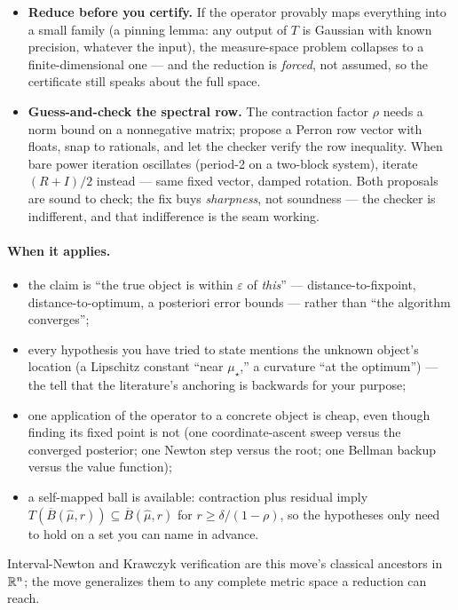 \begin{itemize}
\item \textbf{Reduce before you certify.} If the operator provably
  maps everything into a small family (a pinning lemma: any output of
  $T$ is Gaussian with known precision, whatever the input), the
  measure-space problem collapses to a finite-dimensional one --- and
  the reduction is \emph{forced}, not assumed, so the certificate
  still speaks about the full space.
\item \textbf{Guess-and-check the spectral row.} The contraction
  factor $\rho$ needs a norm bound on a nonnegative matrix; propose a
  Perron row vector with floats, snap to rationals, and let the
  checker verify the row inequality. When bare power iteration
  oscillates (period-2 on a two-block system), iterate $(R+I)/2$
  instead --- same fixed vector, damped rotation. Both proposals are
  sound to check; the fix buys \emph{sharpness}, not soundness --- the
  checker is indifferent, and that indifference is the seam working.
\end{itemize}

\paragraph{When it applies.}
\begin{itemize}
\item the claim is ``the true object is within $\varepsilon$ of
  \emph{this}'' --- distance-to-fixpoint, distance-to-optimum, a
  posteriori error bounds --- rather than ``the algorithm
  converges'';
\item every hypothesis you have tried to state mentions the unknown
  object's location (a Lipschitz constant ``near $\mu_\star$,'' a
  curvature ``at the optimum'') --- the tell that the literature's
  anchoring is backwards for your purpose;
\item one application of the operator to a concrete object is cheap,
  even though finding its fixed point is not (one coordinate-ascent
  sweep versus the converged posterior; one Newton step versus the
  root; one Bellman backup versus the value function);
\item a self-mapped ball is available: contraction plus residual imply
  $T(\overline{B}(\hat\mu, r)) \subseteq \overline{B}(\hat\mu, r)$
  for $r \ge \delta/(1-\rho)$, so the hypotheses only need to hold on
  a set you can name in advance.
\end{itemize}

Interval-Newton and Krawczyk verification are this move's classical
ancestors in $\mathbb{R}^n$; the move generalizes them to any complete metric
space a reduction can reach.

